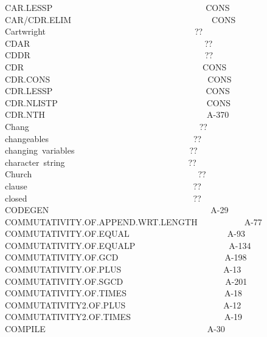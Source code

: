 \documentclass[11pt]{book}
\newenvironment{pubasis}{\begin{flushleft}\ttfamily\small}{\normalsize\rmfamily\end{flushleft}}
\begin{document}
\begin{pubasis}
CAR.LESSP~~~~~~~~~~~~~~~~~~~~~~~~~~~~~~~~~~~~CONS\\
CAR/CDR.ELIM~~~~~~~~~~~~~~~~~~~~~~~~~~~~~~~~~CONS\\
Cartwright~~~~~~~~~~~~~~~~~~~~~~~~~~~~~~~~~~~??\\
CDAR~~~~~~~~~~~~~~~~~~~~~~~~~~~~~~~~~~~~~~~~~??\\
CDDR~~~~~~~~~~~~~~~~~~~~~~~~~~~~~~~~~~~~~~~~~??\\
CDR~~~~~~~~~~~~~~~~~~~~~~~~~~~~~~~~~~~~~~~~~~CONS\\
CDR.CONS~~~~~~~~~~~~~~~~~~~~~~~~~~~~~~~~~~~~~CONS\\
CDR.LESSP~~~~~~~~~~~~~~~~~~~~~~~~~~~~~~~~~~~~CONS\\
CDR.NLISTP~~~~~~~~~~~~~~~~~~~~~~~~~~~~~~~~~~~CONS\\
CDR.NTH~~~~~~~~~~~~~~~~~~~~~~~~~~~~~~~~~~~~~~A-370\\
Chang~~~~~~~~~~~~~~~~~~~~~~~~~~~~~~~~~~~~~~~~??\\
changeables~~~~~~~~~~~~~~~~~~~~~~~~~~~~~~~~~~??\\
changing~variables~~~~~~~~~~~~~~~~~~~~~~~~~~~??\\
character~string~~~~~~~~~~~~~~~~~~~~~~~~~~~~~??\\
Church~~~~~~~~~~~~~~~~~~~~~~~~~~~~~~~~~~~~~~~??\\
clause~~~~~~~~~~~~~~~~~~~~~~~~~~~~~~~~~~~~~~~??\\
closed~~~~~~~~~~~~~~~~~~~~~~~~~~~~~~~~~~~~~~~??\\
CODEGEN~~~~~~~~~~~~~~~~~~~~~~~~~~~~~~~~~~~~~~A-29\\
COM\-MU\-TA\-TIV\-ITY.OF.APPEND.WRT.LENGTH~~~~~~~~~~~A-77\\
COM\-MU\-TA\-TIV\-ITY.OF.EQUAL~~~~~~~~~~~~~~~~~~~~~~~A-93\\
COM\-MU\-TA\-TIV\-ITY.OF.EQUALP~~~~~~~~~~~~~~~~~~~~~~A-134\\
COM\-MU\-TA\-TIV\-ITY.OF.GCD~~~~~~~~~~~~~~~~~~~~~~~~~A-198\\
COM\-MU\-TA\-TIV\-ITY.OF.PLUS~~~~~~~~~~~~~~~~~~~~~~~~A-13\\
COM\-MU\-TA\-TIV\-ITY.OF.SGCD~~~~~~~~~~~~~~~~~~~~~~~~A-201\\
COM\-MU\-TA\-TIV\-ITY.OF.TIMES~~~~~~~~~~~~~~~~~~~~~~~A-18\\
COM\-MU\-TA\-TIV\-ITY2.OF.PLUS~~~~~~~~~~~~~~~~~~~~~~~A-12\\
COM\-MU\-TA\-TIV\-ITY2.OF.TIMES~~~~~~~~~~~~~~~~~~~~~~A-19\\
COMPILE~~~~~~~~~~~~~~~~~~~~~~~~~~~~~~~~~~~~~~A-30\\

\end{pubasis}
\end{document}
